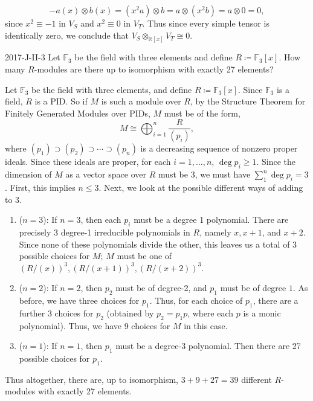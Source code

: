\documentclass{article}
\begin{document}
	\begin{equation*}
		-a(x) \otimes b(x) = (x^{2}a) \otimes b = a \otimes (x^{2}b) = a \otimes 0 =0, 
	\end{equation*}
	since $x^{2} \equiv -1$ in $V_{S}$ and $x^{2} \equiv 0$ in $V_{T}$. Thus since every simple tensor is identically zero, we conclude that $V_{S} \otimes_{\mathbb{R}[x]} V_{T} \cong 0$. 
	\begin{prb}{2017-J-II-3}
	Let $\mathbb{F}_{3}$ be the field with three elements and define $R \coloneqq \mathbb{F}_{3}[x]$. How many $R$-modules are there up to isomorphism with exactly 27 elements? 
	\end{prb}
	Let $\mathbb{F}_{3}$ be the field with three elements, and define $R \coloneqq \mathbb{F}_{3}[x]$. Since $\mathbb{F}_{3}$ is a field, $R$ is a PID. So if $M$ is such a module over $R$, by the Structure Theorem for Finitely Generated Modules over PIDs, $M$ must be of the form, 
	\begin{equation*}
		M \cong \bigoplus_{i = 1}^{n}\frac{R}{(p_{i})}, 
	\end{equation*}
	where $(p_{1}) \supset (p_{2}) \supset \dotsm \supset (p_{n})$ is a decreasing sequence of nonzero proper ideals. Since these ideals are proper, for each $i = 1, \ldots, n$, $\deg{p_{i}} \geq 1$. Since the dimension of $M$ as a vector space over $R$ must be 3, we must have $\sum_{1}^{n}\deg{p_{i}} = 3$. First, this implies $n \leq 3$. Next, we look at the possible different ways of adding to $3$. \vspace{-0.25cm}
	\begin{enumerate}[itemsep =-2pt,label = (\arabic{*})]
		\item ($n = 3$): If $n = 3$, then each $p_{i}$ must be a degree 1 polynomial. There are precisely 3 degree-1 irreducible polynomials in $R$, namely $x, x + 1$, and $x + 2$. Since none of these polynomials divide the other, this leaves us a total of 3 possible choices for $M$; $M$ must be one of $(R/(x))^3, (R/(x + 1))^3, (R/(x + 2))^3$. 
		\item ($n = 2$): If $n = 2$, then $p_{2}$ must be of degree-2, and $p_{1}$ must be of degree $1$. As before, we have three choices for $p_{1}$. Thus, for each choice of $p_{1}$, there are a further 3 choices for $p_{2}$ (obtained by $p_{2} = p_{1}p$, where each $p$ is a monic polynomial). Thus, we have 9 choices for $M$ in this case. 
		\item ($n = 1$): If $n = 1$, then $p_{1}$ must be a degree-3 polynomial. Then there are 27 possible choices for $p_1$.  
	\end{enumerate}
	Thus altogether, there are, up to isomorphism, $3 + 9 + 27 = 39$ different $R$-modules with exactly 27 elements. 
	
\end{document}
